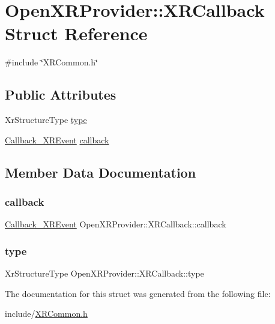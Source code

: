 \hypertarget{struct_open_x_r_provider_1_1_x_r_callback}{}\section{Open\+X\+R\+Provider\+::X\+R\+Callback Struct Reference}
\label{struct_open_x_r_provider_1_1_x_r_callback}


{\ttfamily \#include \char`\"{}X\+R\+Common.\+h\char`\"{}}

\subsection*{Public Attributes}
\begin{DoxyCompactItemize}
\item 
Xr\+Structure\+Type \mbox{\hyperlink{struct_open_x_r_provider_1_1_x_r_callback_a40536357562a259c3a1bc91f99cc088e}{type}}
\item 
\mbox{\hyperlink{namespace_open_x_r_provider_a23b2e01bea1c0c0d762560792d8dff0f}{Callback\+\_\+\+X\+R\+Event}} \mbox{\hyperlink{struct_open_x_r_provider_1_1_x_r_callback_abf3c3676fca347f666e8c97906bec53d}{callback}}
\end{DoxyCompactItemize}


\subsection{Member Data Documentation}
\mbox{\label{struct_open_x_r_provider_1_1_x_r_callback_abf3c3676fca347f666e8c97906bec53d}} 
\subsubsection{\texorpdfstring{callback}{callback}}
{\footnotesize\ttfamily \mbox{\hyperlink{namespace_open_x_r_provider_a23b2e01bea1c0c0d762560792d8dff0f}{Callback\+\_\+\+X\+R\+Event}} Open\+X\+R\+Provider\+::\+X\+R\+Callback\+::callback}

\mbox{\label{struct_open_x_r_provider_1_1_x_r_callback_a40536357562a259c3a1bc91f99cc088e}} 
\subsubsection{\texorpdfstring{type}{type}}
{\footnotesize\ttfamily Xr\+Structure\+Type Open\+X\+R\+Provider\+::\+X\+R\+Callback\+::type}



The documentation for this struct was generated from the following file\+:\begin{DoxyCompactItemize}
\item 
include/\mbox{\hyperlink{_x_r_common_8h}{X\+R\+Common.\+h}}\end{DoxyCompactItemize}
